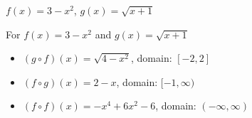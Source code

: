 {$f(x) = 3-x^2$, $g(x) = \sqrt{x+1}$ }
{For   $f(x) = 3-x^2$ and $g(x) = \sqrt{x+1}$ 

\begin{itemize}

\item  $(g \circ f)(x) = \sqrt{4-x^2}$, domain: $[-2,2]$

\item  $(f \circ g)(x) =2-x$, domain: $[-1, \infty)$

\item  $(f \circ f)(x) = -x^4+6x^2-6$, domain: $(-\infty, \infty)$

\end{itemize}}